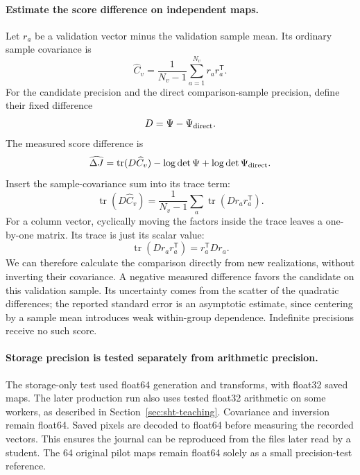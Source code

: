 \documentclass[11pt]{article}
\begin{document}
\paragraph{Estimate the score difference on independent maps.}
Let $r_a$ be a validation vector minus the validation sample mean. Its
ordinary sample covariance is
\begin{equation}
 \widehat C_v=\frac1{N_v-1}\sum_{a=1}^{N_v}r_ar_a^{\mathsf T}.
\end{equation}
For the candidate precision and the direct comparison-sample precision,
define their fixed difference
\begin{equation}
 D=\Psi-\Psi_{\rm direct}.
\end{equation}
The measured score difference is
\begin{equation}
 \widehat{\Delta J}=\operatorname{tr}(D\widehat C_v)
             -\log\det\Psi+\log\det\Psi_{\rm direct}.
\end{equation}
Insert the sample-covariance sum into its trace term:
\begin{equation}
 \operatorname{tr}(D\widehat C_v)
 =\frac1{N_v-1}\sum_a\operatorname{tr}(Dr_ar_a^{\mathsf T}).
\end{equation}
For a column vector, cyclically moving the factors inside the trace leaves
a one-by-one matrix. Its trace is just its scalar value:
\begin{equation}
 \operatorname{tr}(Dr_ar_a^{\mathsf T})=r_a^{\mathsf T}Dr_a.
\end{equation}
We can therefore calculate the comparison directly from new realizations,
without inverting their covariance. A negative measured difference favors
the candidate on this validation sample. Its uncertainty comes from the
scatter of the quadratic differences; the reported standard error is an
asymptotic estimate, since centering by a sample mean introduces weak
within-group dependence. Indefinite precisions receive no such score.

\paragraph{Storage precision is tested separately from arithmetic precision.}
The storage-only test used float64 generation and transforms, with
float32 saved maps. The later production run also uses tested float32
arithmetic on some workers, as described in Section~\ref{sec:sht-teaching}.
Covariance and inversion remain float64. Saved pixels are decoded to float64 before measuring the recorded
vectors. This ensures the journal can be reproduced from the files later
read by a student. The 64 original pilot maps remain float64 solely as a
small precision-test reference.
\end{document}
